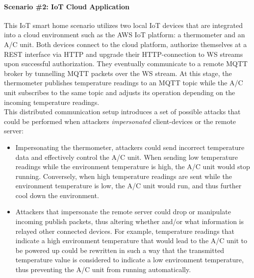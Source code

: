 \paragraph{Scenario \#2: \ac{IoT} Cloud Application}
\label{par:scenario-2} This \ac{IoT} smart home scenario utilizes two local \ac{IoT} devices that are integrated into a cloud environment such as the \ac{AWS} \ac{IoT} platform: a thermometer and an \ac{A/C} unit. Both devices connect to the cloud platform, authorize themselves at a \ac{REST} interface via \ac{HTTP} and upgrade their \ac{HTTP}-connection to \ac{WS} streams upon successful authorization. They eventually communicate to a remote \ac{MQTT} broker by tunnelling \ac{MQTT} packets over the \ac{WS} stream. At this stage, the thermometer publishes temperature readings to an \ac{MQTT} topic while the \ac{A/C} unit subscribes to the same topic and adjusts its operation depending on the incoming temperature readings. \\
This distributed communication setup introduces a set of possible attacks that could be performed when attackers \emph{impersonated} client-devices or the remote server:
\begin{itemize}
    \item Impersonating the thermometer, attackers could send incorrect temperature data and effectively control the \ac{A/C} unit. When sending low temperature readings while the environment temperature is high, the \ac{A/C} unit would stop running. Conversely, when high temperature readings are sent while the environment temperature is low, the \ac{A/C} unit would run, and thus further cool down the environment.
    \item Attackers that impersonate the remote server could drop or manipulate incoming publish packets, thus altering whether and/or what information is relayed other connected devices. For example, temperature readings that indicate a high environment temperature that would lead to the \ac{A/C} unit to be powered up could be rewritten in such a way that the transmitted temperature value is considered to indicate a low environment temperature, thus preventing the \ac{A/C} unit from running automatically.
\end{itemize}

